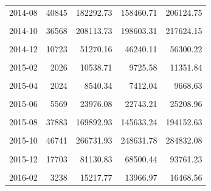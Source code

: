 \begin{longtable}[t]{crrrr}
2014-08 & 40845 & 182292.73 & 158460.71 & 206124.75\\
\cellcolor{gray!10}{2014-09} & \cellcolor{gray!10}{42049} & \cellcolor{gray!10}{220293.67} & \cellcolor{gray!10}{203743.63} & \cellcolor{gray!10}{236843.71}\\
2014-10 & 36568 & 208113.73 & 198603.31 & 217624.15\\
\cellcolor{gray!10}{2014-11} & \cellcolor{gray!10}{17667} & \cellcolor{gray!10}{84864.09} & \cellcolor{gray!10}{75185.12} & \cellcolor{gray!10}{94543.06}\\
2014-12 & 10723 & 51270.16 & 46240.11 & 56300.22\\
\cellcolor{gray!10}{2015-01} & \cellcolor{gray!10}{4313} & \cellcolor{gray!10}{22273.50} & \cellcolor{gray!10}{19032.22} & \cellcolor{gray!10}{25514.79}\\
2015-02 & 2026 & 10538.71 & 9725.58 & 11351.84\\
\cellcolor{gray!10}{2015-03} & \cellcolor{gray!10}{1659} & \cellcolor{gray!10}{7644.74} & \cellcolor{gray!10}{6029.93} & \cellcolor{gray!10}{9259.56}\\
2015-04 & 2024 & 8540.34 & 7412.04 & 9668.63\\
\cellcolor{gray!10}{2015-05} & \cellcolor{gray!10}{2169} & \cellcolor{gray!10}{9996.07} & \cellcolor{gray!10}{8252.66} & \cellcolor{gray!10}{11739.47}\\
2015-06 & 5569 & 23976.08 & 22743.21 & 25208.96\\
\cellcolor{gray!10}{2015-07} & \cellcolor{gray!10}{8541} & \cellcolor{gray!10}{46688.58} & \cellcolor{gray!10}{31176.20} & \cellcolor{gray!10}{62200.95}\\
2015-08 & 37883 & 169892.93 & 145633.24 & 194152.63\\
\cellcolor{gray!10}{2015-09} & \cellcolor{gray!10}{61739} & \cellcolor{gray!10}{306396.27} & \cellcolor{gray!10}{291538.15} & \cellcolor{gray!10}{321254.39}\\
2015-10 & 46741 & 266731.93 & 248631.78 & 284832.08\\
\cellcolor{gray!10}{2015-11} & \cellcolor{gray!10}{26411} & \cellcolor{gray!10}{124350.30} & \cellcolor{gray!10}{105750.83} & \cellcolor{gray!10}{142949.78}\\
2015-12 & 17703 & 81130.83 & 68500.44 & 93761.23\\
\cellcolor{gray!10}{2016-01} & \cellcolor{gray!10}{5960} & \cellcolor{gray!10}{29998.53} & \cellcolor{gray!10}{23635.31} & \cellcolor{gray!10}{36361.75}\\
2016-02 & 3238 & 15217.77 & 13966.97 & 16468.56\\

\end{longtable}
